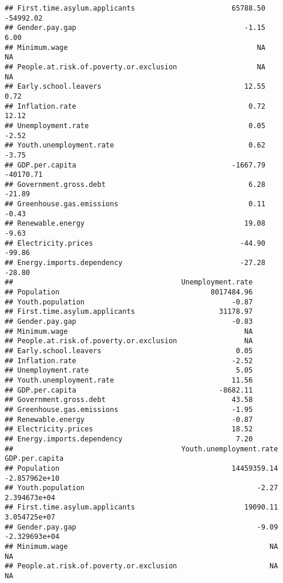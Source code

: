 \documentclass[
]{article}
\begin{document}
\begin{verbatim}
## First.time.asylum.applicants                       65788.50      -54992.02
## Gender.pay.gap                                        -1.15           6.00
## Minimum.wage                                             NA             NA
## People.at.risk.of.poverty.or.exclusion                   NA             NA
## Early.school.leavers                                  12.55           0.72
## Inflation.rate                                         0.72          12.12
## Unemployment.rate                                      0.05          -2.52
## Youth.unemployment.rate                                0.62          -3.75
## GDP.per.capita                                     -1667.79      -40170.71
## Government.gross.debt                                  6.28         -21.89
## Greenhouse.gas.emissions                               0.11          -0.43
## Renewable.energy                                      19.08          -9.63
## Electricity.prices                                   -44.90         -99.86
## Energy.imports.dependency                            -27.28         -28.80
##                                        Unemployment.rate
## Population                                    8017484.96
## Youth.population                                   -0.87
## First.time.asylum.applicants                    31178.97
## Gender.pay.gap                                     -0.83
## Minimum.wage                                          NA
## People.at.risk.of.poverty.or.exclusion                NA
## Early.school.leavers                                0.05
## Inflation.rate                                     -2.52
## Unemployment.rate                                   5.05
## Youth.unemployment.rate                            11.56
## GDP.per.capita                                  -8682.11
## Government.gross.debt                              43.58
## Greenhouse.gas.emissions                           -1.95
## Renewable.energy                                   -0.87
## Electricity.prices                                 18.52
## Energy.imports.dependency                           7.20
##                                        Youth.unemployment.rate GDP.per.capita
## Population                                         14459359.14  -2.857962e+10
## Youth.population                                         -2.27   2.394673e+04
## First.time.asylum.applicants                          19090.11   3.054725e+07
## Gender.pay.gap                                           -9.09  -2.329693e+04
## Minimum.wage                                                NA             NA
## People.at.risk.of.poverty.or.exclusion                      NA             NA

\end{verbatim}
\end{document}
